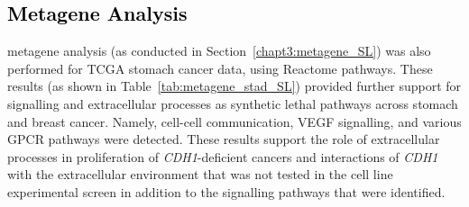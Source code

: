 \FloatBarrier

\subsection{\textcolor{black}{Metagene Analysis}} \label{chapt3:metagene_stad_SL}

\Gls{metagene} analysis (as conducted in Section~\ref{chapt3:metagene_SL}) was also performed for \gls{TCGA} stomach cancer  data, using Reactome \glspl{pathway}. These results (as shown in Table~\ref{tab:metagene_stad_SL}) provided further support for signalling and extracellular processes as \gls{synthetic lethal} \glspl{pathway} across stomach and breast cancer. Namely, cell-cell communication, VEGF signalling, and various \gls{GPCR} \glspl{pathway} were detected.  
%
These results support the role of extracellular processes in proliferation of \textit{CDH1}-deficient cancers and interactions of \textit{CDH1} with the extracellular environment that was not tested in the cell line experimental screen in addition to the signalling pathways that were identified.

